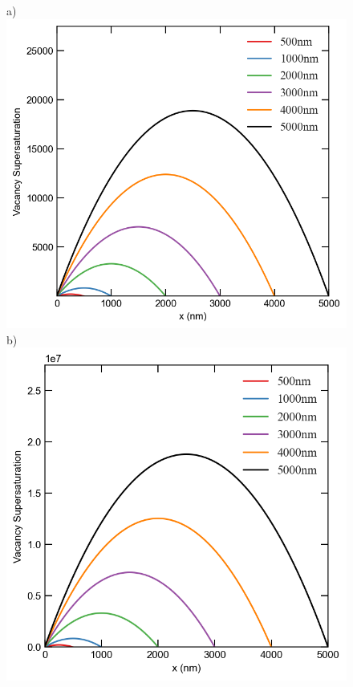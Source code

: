 \documentclass[utf8]{frontiersSCNS} %
\begin{document}
    \begin{figure}[h!]
        \centering
        a)\includegraphics[scale=0.55]{Fig7_a}
        b)\includegraphics[scale=0.55]{Fig7_b}
        \qquad

\end{figure}
\end{document}
